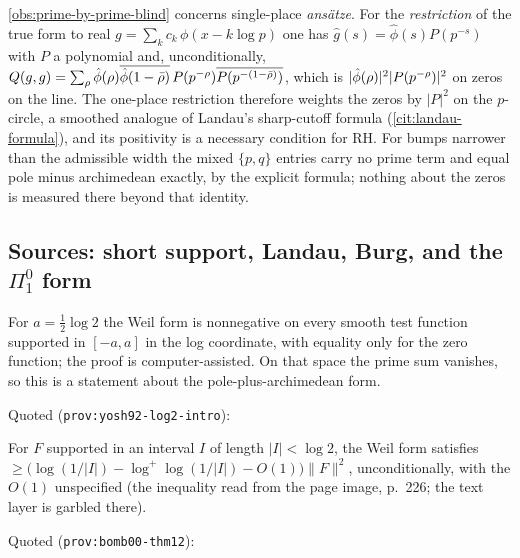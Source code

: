 \begin{observation}
\label{obs:single-place-restriction}
\cref{obs:prime-by-prime-blind} concerns single-place \emph{ansätze}. For the \emph{restriction} of the true
form to real $g = \sum_kc_k\,\phi(x-k\log p)$ one has $\hat g(s) = \hat\phi(s)P(p^{-s})$ with $P$ a polynomial and,
unconditionally, $Q(g,g) = \sum_\rho\hat\phi(\rho)\overline{\hat\phi(1-\bar{\rho})}\,P(p^{-\rho})\overline{P(p^{-(1-\bar{\rho})})}$,
which is $|\hat\phi(\rho)|^2|P(p^{-\rho})|^2$ on zeros on the line. The one-place restriction therefore weights
the zeros by $|P|^2$ on the $p$-circle, a smoothed analogue of Landau's sharp-cutoff formula
(\cref{cit:landau-formula}), and its positivity is a necessary condition for RH. For bumps narrower than the
admissible width the mixed $\{p,q\}$ entries carry no prime term and equal pole minus archimedean exactly, by
the explicit formula; nothing about the zeros is measured there beyond that identity.
\end{observation}

\subsection{Sources: short support, Landau, Burg, and the $\Pi^0_1$ form}

\begin{citedfact}
\label{cit:yoshida-short-support}
For $a = \tfrac12\log2$ the Weil form is nonnegative on every smooth test function supported in $[-a,a]$ in
the log coordinate, with equality only for the zero function; the proof is computer-assisted. On that space
the prime sum vanishes, so this is a statement about the pole-plus-archimedean form.

\par\noindent Quoted (\texttt{prov:yosh92-log2-intro}):
{\small\texttt{}}
\end{citedfact}

\begin{citedfact}
\label{cit:bombieri-short-support}
For $F$ supported in an interval $I$ of length $|I|<\log2$, the Weil form satisfies
$\ge\big(\log(1/|I|)-\log^+\log(1/|I|)-O(1)\big)\|F\|^2$, unconditionally, with the $O(1)$ unspecified (the
inequality read from the page image, p.~226; the text layer is garbled there).

\par\noindent Quoted (\texttt{prov:bomb00-thm12}):
{\small\texttt{}}
\end{citedfact}

